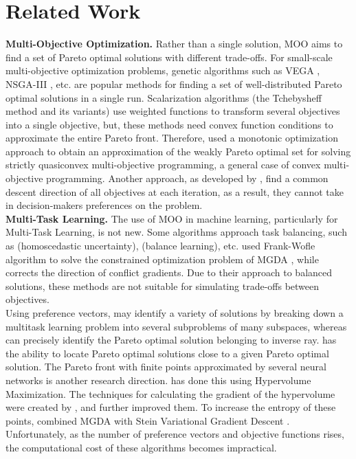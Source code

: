 \documentclass[letterpaper]{article} %
\begin{document}
\section{Related Work}
\label{st:4}
\indent \textbf{Multi-Objective Optimization.} Rather than a single solution, MOO aims to find a set of Pareto optimal solutions with different trade-offs. For small-scale multi-objective optimization problems, genetic algorithms such as VEGA \cite{inproceedings}, NSGA-III \cite{6600851}, etc. are popular methods for finding a set of well-distributed Pareto optimal solutions in a single run. Scalarization algorithms (the Tchebysheff method \cite{article} and its variants) use weighted functions to transform several objectives into a single objective, but, these methods need convex function conditions to approximate the entire Pareto front. Therefore, \cite{thang2020monotonic} used a monotonic optimization approach to obtain an approximation of the weakly Pareto optimal set for solving strictly quasiconvex multi-objective programming, a general case of convex multi-objective programming. Another approach, as developed by \cite{gradientbased1}, \cite{gradientbased3} find a common descent direction of all objectives at each iteration, as a result, they cannot take in decision-makers preferences on the problem.\\
\indent \textbf{Multi-Task Learning.} The use of MOO in machine learning, particularly for Multi-Task Learning, is not new.  Some algorithms approach task balancing, such as \cite{kendall2018multitask} (homoscedastic uncertainty), \cite{chen2018gradnorm} (balance learning), etc. \cite{sener2019multitask} used Frank-Wofle algorithm to solve the constrained optimization problem of MGDA \cite{gradientbased3}, while \cite{yu2020gradient} corrects the direction of conflict gradients. Due to their approach to balanced solutions, these methods are not suitable for simulating trade-offs between objectives. \\
Using preference vectors, \cite{lin2019pareto} may identify a variety of solutions by breaking down a multitask learning problem into several subproblems of many subspaces, whereas \cite{pmlr-v119-mahapatra20a} can precisely identify the Pareto optimal solution belonging to inverse ray.  \cite{ma2020efficient} has the ability to locate Pareto optimal solutions close to a given Pareto optimal solution.
The Pareto front with finite points approximated by several neural networks is another research direction. \cite{deist2021multiobjective} has done this using Hypervolume Maximization. The techniques for calculating the gradient of the hypervolume were created by \cite{hypervolumegrad}, and \citep{Dominated-front1, Deist_2020} further improved them. To increase the entropy of these points, \cite{moosvgd} combined MGDA \cite{gradientbased3} with Stein Variational Gradient Descent \cite{svgd}. Unfortunately, as the number of preference vectors and objective functions rises, the computational cost of these algorithms becomes impractical. \\
\end{document}
